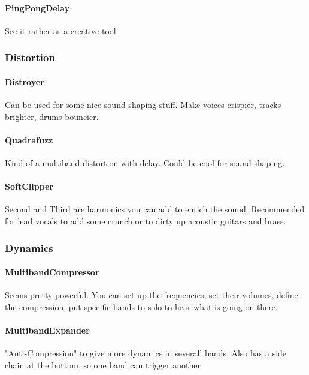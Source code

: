 \documentclass[10pt]{article}
\begin{document}
\paragraph{PingPongDelay}

See it rather as a creative tool

\subsubsection{Distortion}

\paragraph{Distroyer}

Can be used for some nice sound shaping stuff. Make voices crispier, tracks brighter, drums bouncier.

\paragraph{Quadrafuzz}

Kind of a multiband distortion with delay. Could be cool for sound-shaping.

\paragraph{SoftClipper}

Second and Third are harmonics you can add to enrich the sound. Recommended for lead vocals to add some crunch or to dirty up acoustic guitars and brass.

\subsubsection{Dynamics}

\paragraph{MultibandCompressor}

Seems pretty powerful. You can set up the frequencies, set their volumes, define the compression, put specific bands to solo to hear what is going on there.

\paragraph{MultibandExpander}

"Anti-Compression" to give more dynamics in severall bands. Also has a side chain at the bottom, so one band can trigger another
\end{document}
